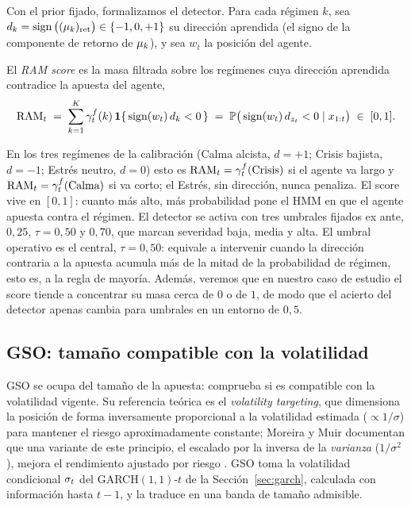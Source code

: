 Con el prior fijado, formalizamos el detector. Para cada régimen $k$, sea $d_k = \operatorname{sign}\big((\mu_k)_{\mathrm{ret}}\big) \in \{-1, 0, +1\}$ su dirección aprendida (el signo de la componente de retorno de $\mu_k$), y sea $w_t$ la posición del agente.

\begin{definicion}
\label{def:ram}
El \emph{RAM score} es la masa filtrada sobre los regímenes cuya dirección aprendida contradice la apuesta del agente,
\[
\mathrm{RAM}_t \;=\; \sum_{k=1}^{K} \gamma^{f}_t(k)\, \mathbf{1}\{\, \operatorname{sign}(w_t)\, d_k < 0 \,\} \;=\; \mathbb{P}\big(\operatorname{sign}(w_t)\, d_{z_t} < 0 \mid x_{1:t}\big) \;\in\; [0,1].
\]
\end{definicion}

En los tres regímenes de la calibración (Calma alcista, $d=+1$; Crisis bajista, $d=-1$; Estrés neutro, $d=0$) esto es $\mathrm{RAM}_t = \gamma^{f}_t(\text{Crisis})$ si el agente va largo y $\mathrm{RAM}_t = \gamma^{f}_t(\text{Calma})$ si va corto; el Estrés, sin dirección, nunca penaliza. El score vive en $[0,1]$: cuanto más alto, más probabilidad pone el HMM en que el agente apuesta contra el régimen. El detector se activa con tres umbrales fijados ex ante, $0{,}25$, $\tau = 0{,}50$ y $0{,}70$, que marcan severidad baja, media y alta. El umbral operativo es el central, $\tau = 0{,}50$: equivale a intervenir cuando la dirección contraria a la apuesta acumula más de la mitad de la probabilidad de régimen, esto es, a la regla de mayoría. Además, veremos que en nuestro caso de estudio el score tiende a concentrar su masa cerca de $0$ o de $1$, de modo que el acierto del detector apenas cambia para umbrales en un entorno de $0{,}5$.

\subsection{GSO: tamaño compatible con la volatilidad}
\label{sec:strata-gso}

GSO se ocupa del tamaño de la apuesta: comprueba si es compatible con la volatilidad vigente. Su referencia teórica es el \emph{volatility targeting}, que dimensiona la posición de forma inversamente proporcional a la volatilidad estimada ($\propto 1/\sigma$) para mantener el riesgo aproximadamente constante; Moreira y Muir documentan que una variante de este principio, el escalado por la inversa de la \emph{varianza} ($1/\sigma^2$), mejora el rendimiento ajustado por riesgo \cite{moreira2017}. GSO toma la volatilidad condicional $\sigma_t$ del GARCH$(1,1)$-$t$ de la Sección~\ref{sec:garch}, calculada con información hasta $t-1$, y la traduce en una banda de tamaño admisible.

